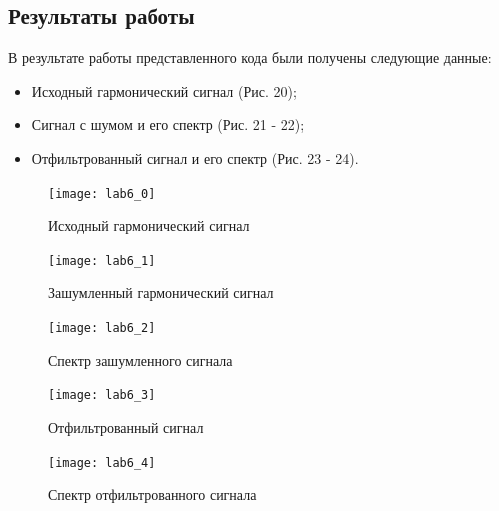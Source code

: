 \documentclass[10pt,a4paper]{article}
\begin{document}
\subsection{Результаты работы}
В результате работы представленного кода были получены следующие данные:

\begin{itemize}
\item Исходный гармонический сигнал (Рис. 20); 
\item Сигнал с шумом и его спектр (Рис. 21 - 22);
\item Отфильтрованный сигнал и его спектр (Рис. 23 - 24).
\end{itemize}

\begin{figure}[h]
\centering
\texttt{[image: lab6\_0]} 
\caption{Исходный гармонический сигнал} 
\label{fig.l6_0} 
\end{figure}

\begin{figure}[h]\centering
  \parbox[b]{0.49\textwidth}{\centering
    \texttt{[image: lab6\_1]} 
    \caption{Зашумленный гармонический сигнал}\label{fig.l6_1}}
  \hfil\hfil 
  \begin{minipage}[b]{0.49\textwidth}
	\centering
	\texttt{[image: lab6\_2]}
	\caption{Спектр зашумленного сигнала}\label{fig.l6_2} 
  \end{minipage}
\end{figure}

\begin{figure}[h]\centering
  \parbox[b]{0.49\textwidth}{\centering
    \texttt{[image: lab6\_3]} 
    \caption{Отфильтрованный сигнал}\label{fig.l6_3}}
  \hfil\hfil 
  \begin{minipage}[b]{0.49\textwidth}
	\centering
	\texttt{[image: lab6\_4]}
	\caption{Спектр отфильтрованного сигнала}\label{fig.l6_4} 
  \end{minipage}
\end{figure}
\end{document}
